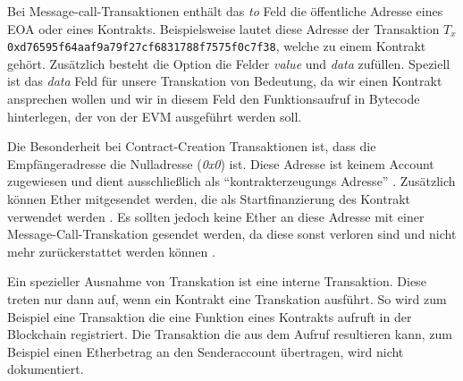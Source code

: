 \documentclass[runningheads]{llncs}
\begin{document}
Bei Message-call-Transaktionen enthält das \textit{to} Feld die öffentliche Adresse eines EOA oder eines Kontrakts. Beispielsweise lautet diese Adresse  der Transaktion $T_x$ \verb+0xd76595f64aaf9a79f27cf6831788f7575f0c7f38+, welche zu einem Kontrakt gehört. Zusätzlich besteht die Option die Felder \textit{value} und \textit{data} zufüllen. Speziell ist das \textit{data} Feld für unsere Transkation von Bedeutung, da wir einen Kontrakt ansprechen wollen und wir in diesem Feld den Funktionsaufruf in Bytecode hinterlegen, der von der EVM ausgeführt werden soll.

Die Besonderheit bei Contract-Creation Transaktionen ist, dass die Empfängeradresse die Nulladresse (\textit{0x0}) ist. Diese Adresse ist keinem Account zugewiesen und dient ausschließlich als "`kontrakterzeugungs Adresse"' \cite{antonopoulos_mastering_2019}. Zusätzlich können Ether mitgesendet werden, die als Startfinanzierung des Kontrakt verwendet werden \cite[S. 4]{wood_ethereum/yellowpaper_2019}. Es sollten jedoch keine Ether an diese Adresse mit einer Message-Call-Transkation gesendet werden, da diese sonst verloren sind und nicht mehr zurückerstattet werden können \cite[S. 112]{antonopoulos_mastering_2019}.

Ein spezieller Ausnahme von Transkation ist eine interne Transaktion. Diese treten nur dann auf, wenn ein Kontrakt eine Transkation ausführt. So wird zum Beispiel eine Transaktion die eine Funktion eines Kontrakts aufruft in der Blockchain registriert. Die Transaktion die aus dem Aufruf resultieren kann, zum Beispiel einen Etherbetrag an den Senderaccount übertragen, wird nicht dokumentiert\cite[S. 40]{antonopoulos_mastering_2019}.

\end{document}
